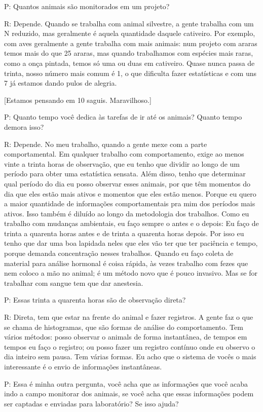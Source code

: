 P: Quantos animais são monitorados em um projeto?

R: Depende. Quando se trabalha com animal silvestre, a gente trabalha com um N reduzido, mas geralmente é aquela quantidade daquele cativeiro. Por exemplo, com aves geralmente a gente trabalha com mais animais: num projeto com araras temos mais do que 25 araras, mas quando trabalhamos com espécies mais raras, como a onça pintada, temos só uma ou duas em cativeiro. Quase nunca passa de trinta, nosso número mais comum é 1, o que dificulta fazer estatísticas e com uns 7 já estamos dando pulos de alegria.


[Estamos pensando em 10 saguis.
Maravilhoso.]


P: Quanto tempo você dedica às tarefas de ir até os animais? Quanto tempo demora isso?

R: Depende. No meu trabalho, quando a gente mexe com a parte comportamental. Em qualquer trabalho com comportamento, exige ao menos vinte a trinta horas de observação, que eu tenho que dividir ao longo de um período para obter uma estatística sensata. Além disso, tenho que determinar qual período do dia eu posso observar esses animais, por que têm momentos do dia que eles estão mais ativos e momentos que eles estão menos. Porque eu quero a maior quantidade de informações comportamentais pra mim dos períodos mais ativos. Isso também é diluído ao longo da metodologia dos trabalhos. Como eu trabalho com mudanças ambientais, eu faço sempre o antes e o depois: Eu faço de trinta a quarenta horas antes e de trinta a quarenta horas depois. Por isso eu tenho que dar uma boa lapidada neles que eles vão ter que ter paciência e tempo, porque demanda concentração nesses trabalhos. Quando eu faço coleta de material para análise hormonal é coisa rápida, às vezes trabalho com fezes que nem coloco a mão no animal; é um método novo que é pouco invasivo. Mas se for trabalhar com sangue tem que dar anestesia.


P: Essas trinta a quarenta horas são de observação direta?

R: Direta, tem que estar na frente do animal e fazer registros. A gente faz o que se chama de histogramas, que são formas de análise do comportamento. Tem vários métodos: posso observar o animals de forma instantânea, de tempos em tempos eu faço o registro; ou posso fazer um registro contínuo onde eu observo o dia inteiro sem pausa. Tem várias formas. Eu acho que o sistema de vocês o mais interessante é o envio de informações instantâneas. 


P: Essa é minha outra pergunta, você acha que as informações que você acaba indo a campo monitorar dos animais, se você acha que essas informações podem ser captadas e enviadas para laboratório? Se isso ajuda?

